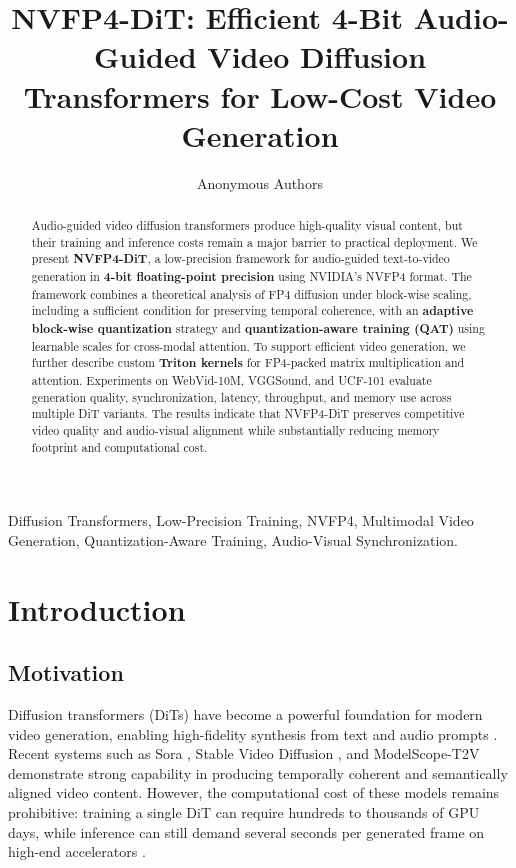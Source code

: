 \documentclass[journal,twoside]{IEEEtran}
\theoremstyle{definition}
\theoremstyle{remark}
\begin{document}
\title{NVFP4-DiT: Efficient 4-Bit Audio-Guided Video Diffusion Transformers for Low-Cost Video Generation}

\author{Anonymous Authors}

\maketitle

\begin{abstract}
Audio-guided video diffusion transformers produce high-quality visual content, but their training and inference costs remain a major barrier to practical deployment. We present \textbf{NVFP4-DiT}, a low-precision framework for audio-guided text-to-video generation in \textbf{4-bit floating-point precision} using NVIDIA's NVFP4 format. The framework combines a theoretical analysis of FP4 diffusion under block-wise scaling, including a sufficient condition for preserving temporal coherence, with an \textbf{adaptive block-wise quantization} strategy and \textbf{quantization-aware training (QAT)} using learnable scales for cross-modal attention. To support efficient video generation, we further describe custom \textbf{Triton kernels} for FP4-packed matrix multiplication and attention. Experiments on WebVid-10M, VGGSound, and UCF-101 evaluate generation quality, synchronization, latency, throughput, and memory use across multiple DiT variants. The results indicate that NVFP4-DiT preserves competitive video quality and audio-visual alignment while substantially reducing memory footprint and computational cost.
\end{abstract}

\begin{IEEEkeywords}
Diffusion Transformers, Low-Precision Training, NVFP4, Multimodal Video Generation, Quantization-Aware Training, Audio-Visual Synchronization.
\end{IEEEkeywords}

\section{Introduction}

\subsection{Motivation}
Diffusion transformers (DiTs) \cite{peebles2023scalable} have become a powerful foundation for modern video generation, enabling high-fidelity synthesis from text and audio prompts \cite{ho2022imagen, singer2023make, rombach2022high}. Recent systems such as Sora \cite{openai2024sora}, Stable Video Diffusion \cite{stability2023svd}, and ModelScope-T2V \cite{wang2023modelscope} demonstrate strong capability in producing temporally coherent and semantically aligned video content. However, the computational cost of these models remains prohibitive: training a single DiT can require hundreds to thousands of GPU days, while inference can still demand several seconds per generated frame on high-end accelerators \cite{xing2024vidsurvey, openai2024sora}.
\end{document}
